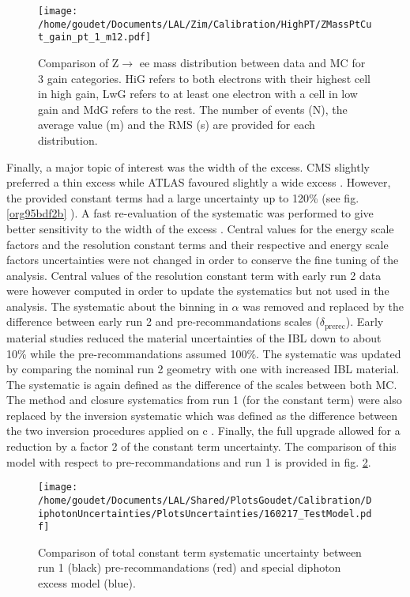 \begin{figure}[htbp]
\centering
\texttt{[image: /home/goudet/Documents/LAL/Zim/Calibration/HighPT/ZMassPtCut\_gain\_pt\_1\_m12.pdf]}
\caption{\label{fig:orgd958247}
Comparison of Z\(\rightarrow\) ee mass distribution between data and MC for 3 gain categories. HiG refers to both electrons with their highest cell in high gain, LwG refers to at least one electron with a cell in low gain and MdG refers to the rest. The number of events (N), the average value (m) and the RMS (s) are provided for each distribution.\cite{ATL-COM-PHYS-2016-184}}
\end{figure}

Finally, a major topic of interest was the width of the excess.
CMS slightly preferred a thin excess \cite{CMS-PAS-EXO-16-018} while ATLAS favoured slightly a wide excess \cite{ATLAS-CONF-2016-018}.
However, the provided constant terms had a large uncertainty up to 120\% (see fig. \ref{org95bdf2b} ).
A fast re-evaluation of the systematic was performed to give better sensitivity to the width of the excess \cite{ATL-COM-PHYS-2016-184}.
Central values for the energy scale factors and the resolution constant terms and their respective and energy scale factors uncertainties were not changed in order to conserve the fine tuning of the analysis.
Central values of the resolution constant term with early run 2 data were however computed in order to update the systematics but not used in the analysis.
The systematic about the binning in \(\alpha\) was removed and replaced by the difference between early run 2 and pre-recommandations scales (\(\delta_{\text{prerec}}\)).
Early material studies reduced the material uncertainties of the IBL down to about 10\% while the pre-recommandations assumed 100\%.
The systematic was updated by comparing the nominal run 2 geometry with one with increased IBL material.
The systematic is again defined as the difference of the scales between both MC.
The method and closure systematics from run 1 (for the constant term) were also replaced by the inversion systematic which was defined as the difference between the two inversion procedures applied on c \cite{Goudet_750Systematics}.
Finally, the full upgrade allowed for a reduction by a factor 2 of the constant term uncertainty.
The comparison of this model with respect to pre-recommandations and run 1 is provided in fig. \ref{fig:org3f93468}.

\begin{figure}[htbp]
\centering
\texttt{[image: /home/goudet/Documents/LAL/Shared/PlotsGoudet/Calibration/DiphotonUncertainties/PlotsUncertainties/160217\_TestModel.pdf]}
\caption{\label{fig:org3f93468}
Comparison of total constant term systematic uncertainty between run 1 (black) pre-recommandations (red) and special diphoton excess model (blue). \cite{ATL-COM-PHYS-2016-184}}
\end{figure}

